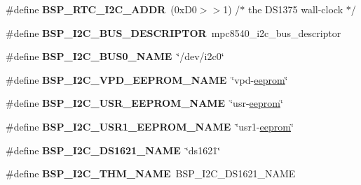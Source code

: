 \begin{DoxyCompactItemize}
\mbox{\label{group__RTEMSBSPsPowerPCMVME3100_gadacf0dd2f6f5ae1951005769c534f581}} 
\#define {\bfseries B\+S\+P\+\_\+\+R\+T\+C\+\_\+\+I2\+C\+\_\+\+A\+D\+DR}~(0x\+D0$>$$>$1)		/$\ast$ the D\+S1375 wall-\/clock $\ast$/
\item 
\mbox{\label{group__RTEMSBSPsPowerPCMVME3100_ga4348cd2d6609f1b1f0f9e8ce4a98c809}} 
\#define {\bfseries B\+S\+P\+\_\+\+I2\+C\+\_\+\+B\+U\+S\+\_\+\+D\+E\+S\+C\+R\+I\+P\+T\+OR}~mpc8540\+\_\+i2c\+\_\+bus\+\_\+descriptor
\item 
\mbox{\label{group__RTEMSBSPsPowerPCMVME3100_ga3a433870b4d7d91081f72deb2ad9562e}} 
\#define {\bfseries B\+S\+P\+\_\+\+I2\+C\+\_\+\+B\+U\+S0\+\_\+\+N\+A\+ME}~\char`\"{}/dev/i2c0\char`\"{}
\item 
\mbox{\label{group__RTEMSBSPsPowerPCMVME3100_ga4e46e135be14c3c0f9957999beb4e680}} 
\#define {\bfseries B\+S\+P\+\_\+\+I2\+C\+\_\+\+V\+P\+D\+\_\+\+E\+E\+P\+R\+O\+M\+\_\+\+N\+A\+ME}~\char`\"{}vpd-\/\mbox{\hyperlink{structeeprom}{eeprom}}\char`\"{}
\item 
\mbox{\label{group__RTEMSBSPsPowerPCMVME3100_gae85811de59e3f6032d0a1b5f2fbbbd57}} 
\#define {\bfseries B\+S\+P\+\_\+\+I2\+C\+\_\+\+U\+S\+R\+\_\+\+E\+E\+P\+R\+O\+M\+\_\+\+N\+A\+ME}~\char`\"{}usr-\/\mbox{\hyperlink{structeeprom}{eeprom}}\char`\"{}
\item 
\mbox{\label{group__RTEMSBSPsPowerPCMVME3100_ga31b07d0efe1aedd7005c7b9a763c3d9a}} 
\#define {\bfseries B\+S\+P\+\_\+\+I2\+C\+\_\+\+U\+S\+R1\+\_\+\+E\+E\+P\+R\+O\+M\+\_\+\+N\+A\+ME}~\char`\"{}usr1-\/\mbox{\hyperlink{structeeprom}{eeprom}}\char`\"{}
\item 
\mbox{\label{group__RTEMSBSPsPowerPCMVME3100_gabfd9ae31bf393d2d82f0ac6413d47712}} 
\#define {\bfseries B\+S\+P\+\_\+\+I2\+C\+\_\+\+D\+S1621\+\_\+\+N\+A\+ME}~\char`\"{}ds1621\char`\"{}
\item 
\mbox{\label{group__RTEMSBSPsPowerPCMVME3100_gaf379938407abe8d343d036b61fbb2b32}} 
\#define {\bfseries B\+S\+P\+\_\+\+I2\+C\+\_\+\+T\+H\+M\+\_\+\+N\+A\+ME}~B\+S\+P\+\_\+\+I2\+C\+\_\+\+D\+S1621\+\_\+\+N\+A\+ME
$$
\end{DoxyCompactItemize}
